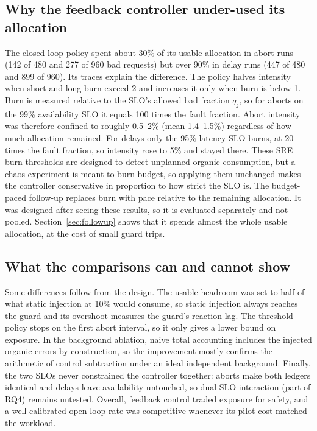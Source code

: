 \documentclass[a4paper,fleqn,11pt]{cas-dc}
\begin{document}
\subsection{Why the feedback controller under-used its allocation}
The closed-loop policy spent about 30\% of its usable allocation in abort runs (142 of 480 and 277 of 960 bad requests) but over 90\% in delay runs (447 of 480 and 899 of 960). Its traces explain the difference. The policy halves intensity when short and long burn exceed 2 and increases it only when burn is below 1. Burn is measured relative to the SLO's allowed bad fraction $q_j$, so for aborts on the 99\% availability SLO it equals 100 times the fault fraction. Abort intensity was therefore confined to roughly 0.5--2\% (mean 1.4--1.5\%) regardless of how much allocation remained. For delays only the 95\% latency SLO burns, at 20 times the fault fraction, so intensity rose to 5\% and stayed there. These SRE burn thresholds are designed to detect unplanned organic consumption, but a chaos experiment is meant to burn budget, so applying them unchanged makes the controller conservative in proportion to how strict the SLO is. The budget-paced follow-up replaces burn with pace relative to the remaining allocation. It was designed after seeing these results, so it is evaluated separately and not pooled. Section~\ref{sec:followup} shows that it spends almost the whole usable allocation, at the cost of small guard trips.

\subsection{What the comparisons can and cannot show}
Some differences follow from the design. The usable headroom was set to half of what static injection at 10\% would consume, so static injection always reaches the guard and its overshoot measures the guard's reaction lag. The threshold policy stops on the first abort interval, so it only gives a lower bound on exposure. In the background ablation, naive total accounting includes the injected organic errors by construction, so the improvement mostly confirms the arithmetic of control subtraction under an ideal independent background. Finally, the two SLOs never constrained the controller together: aborts make both ledgers identical and delays leave availability untouched, so dual-SLO interaction (part of RQ4) remains untested. Overall, feedback control traded exposure for safety, and a well-calibrated open-loop rate was competitive whenever its pilot cost matched the workload.
\end{document}

